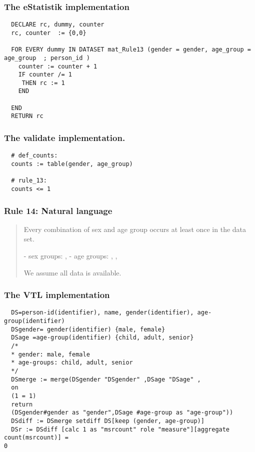 \subsubsection*{The eStatistik implementation}
\begin{verbatim}
  DECLARE rc, dummy, counter
  rc, counter  := {0,0}

  FOR EVERY dummy IN DATASET mat_Rule13 (gender = gender, age_group = age_group  ; person_id )
    counter := counter + 1
    IF counter /= 1
     THEN rc := 1
    END

  END
  RETURN rc
\end{verbatim}
\subsubsection*{The validate implementation.}
\begin{verbatim}
  # def_counts:
  counts := table(gender, age_group)

  # rule_13:
  counts <= 1
\end{verbatim}


\newpage

\subsubsection*{  Rule 14: Natural language}
\begin{quote}


Every combination of sex and age group occurs at least once in the data set.

- sex groups: , 
- age groups: , ,  

We assume all data is available.


\end{quote}
\subsubsection*{The VTL implementation}
\begin{verbatim}
  DS=person-id(identifier), name, gender(identifier), age-group(identifier)
  DSgender= gender(identifier) {male, female}
  DSage =age-group(identifier) {child, adult, senior}
  /*
  * gender: male, female
  * age-groups: child, adult, senior
  */
  DSmerge := merge(DSgender "DSgender" ,DSage "DSage" ,
  on
  (1 = 1)
  return
  (DSgender#gender as "gender",DSage #age-group as "age-group"))
  DSdiff := DSmerge setdiff DS[keep (gender, age-group)]
  DSr := DSdiff [calc 1 as "msrcount" role "measure"][aggregate count(msrcount)] =
0
\end{verbatim}
